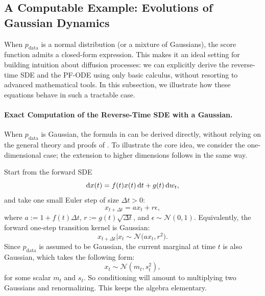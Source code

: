 \subsection{A Computable Example: Evolutions of Gaussian Dynamics}\label{subsec:example-gaussian}
When $p_{\mathrm{data}}$ is a normal distribution (or a mixture of Gaussians), the score function admits a closed-form expression. 
This makes it an ideal setting for building intuition about diffusion processes: we can explicitly derive the reverse-time SDE and the PF-ODE using only basic calculus, without resorting to advanced mathematical tools. 
In this subsection, we illustrate how these equations behave in such a tractable case.



\paragraph{Exact Computation of the Reverse-Time SDE with a Gaussian.}
 When $p_{\mathrm{data}}$ is Gaussian, the formula in  can be derived directly, without relying on the general theory and proofs of \citet{anderson1982reverse}. To illustrate the core idea, we consider the one-dimensional case; the extension to higher dimensions follows in the same way.

 


Start from the forward SDE
\[
\mathop{}\!\mathrm{d} x(t)  =  f(t)  x(t)  \mathop{}\!\mathrm{d} t  +  g(t)  \mathop{}\!\mathrm{d} w_t,
\]
and take one small Euler step of size $\Delta t>0$:
\[
x_{t+\Delta t}  =  a  x_t  +  r  \epsilon,
\]
where $a:=1+f(t)\Delta t$, $r:=g(t)\sqrt{\Delta t}$, and $ \epsilon\sim\mathcal N(0,1)$. Equivalently, the forward one-step transition kernel is Gaussian:
\[
x_{t+\Delta t}   |   x_t  \sim  \mathcal N\!\big(a  x_t,   r^2\big).
\]
Since $p_{\mathrm{data}}$ is assumed to be Gaussian, the current marginal at time $t$ is also Gaussian, which takes the following form:
\[
x_t \sim \mathcal N(m_t,   s_t^2),
\]
for some scalar $m_t$ and $s_t$. So conditioning will amount to multiplying two Gaussians and renormalizing. This keeps the algebra elementary.

